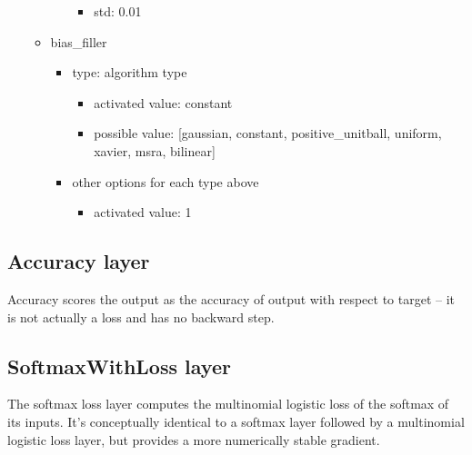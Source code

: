 \documentclass[11pt]{article}
\begin{document}
\begin{itemize}
\begin{itemize}
\begin{itemize}
		\begin{itemize}
			\item std: 0.01
		\end{itemize}
	\end{itemize}
	\item bias\_filler
	\begin{itemize}
		\item type: algorithm type
		\begin{itemize}
			\item activated value: constant
			\item possible value: [gaussian, constant, positive\_unitball, uniform, xavier, msra, bilinear]
		\end{itemize}
		\item other options for each type above
		\begin{itemize}
			\item activated value: 1
		\end{itemize}
	\end{itemize}
	\end{itemize}
\end{itemize}

\subsection{Accuracy layer}
Accuracy scores the output as the accuracy of output with respect to target – it is not actually a loss and has no backward step.

\subsection{SoftmaxWithLoss layer}
The softmax loss layer computes the multinomial logistic loss of the softmax of its inputs. It’s conceptually identical to a softmax layer followed by a multinomial logistic loss layer, but provides a more numerically stable gradient.



\end{document}
